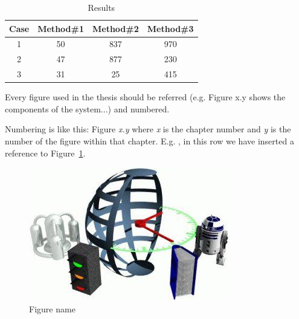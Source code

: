 \begin{table}[ht]
    \caption{Results} %
    \label{tab:nonlin} %
    \centering                          %
    \begin{tabular}{|c|c|c|c|}          %
        \hline
        Case & Method\#1 & Method\#2 & Method\#3 \\ [0.5ex]   %
        \hline                              %
        1 & 50 & 837 & 970 \\               %
        2 & 47 & 877 & 230 \\
        3 & 31 & 25 & 415 \\[1ex]           %
        \hline
    \end{tabular}

\end{table}

Every figure used in the thesis should be referred  (e.g. Figure x.y shows the components of the system...) and numbered.

Numbering is like this: Figure \textit{x.y} where \textit{x} is the chapter number and \textit{y} is the number of the figure within that chapter. E.g. , in this row we have inserted a reference to Figure~\ref{fig:imag}.

\begin{figure}[ht]
    \centering
    \includegraphics[]{figs/test.jpg}
    \caption{Figure name}
    \label{fig:imag}
\end{figure}

